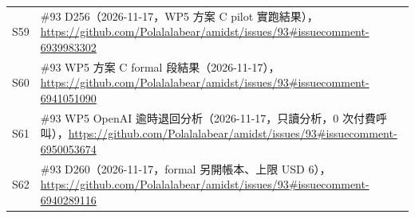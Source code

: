 \documentclass[11pt,a4paper]{article}
\begin{document}
\begin{longtable}{l >{\raggedright\arraybackslash}p{12.6cm}}
S59 & \#93 D256（2026-11-17，WP5 方案 C pilot 實跑結果），\url{https://github.com/Polalalabear/amidst/issues/93\#issuecomment-6939983302} \\
S60 & \#93 WP5 方案 C formal 段結果（2026-11-17），\url{https://github.com/Polalalabear/amidst/issues/93\#issuecomment-6941051090} \\
S61 & \#93 WP5 OpenAI 逾時退回分析（2026-11-17，只讀分析，0 次付費呼叫），\url{https://github.com/Polalalabear/amidst/issues/93\#issuecomment-6950053674} \\
S62 & \#93 D260（2026-11-17，formal 另開帳本、上限 USD 6），\url{https://github.com/Polalalabear/amidst/issues/93\#issuecomment-6940289116} \\
\bottomrule
\end{longtable}
\end{document}
